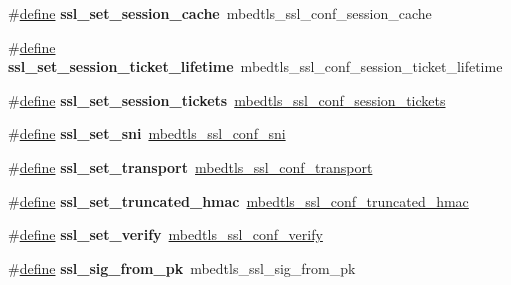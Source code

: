 \begin{DoxyCompactItemize}
\#\hyperlink{structdefine}{define} {\bfseries ssl\+\_\+set\+\_\+session\+\_\+cache}~mbedtls\+\_\+ssl\+\_\+conf\+\_\+session\+\_\+cache
\item 
\mbox{\label{compat-1_83_8h_ac6c83bdfdf7ac965e5949eac4bb98425}} 
\#\hyperlink{structdefine}{define} {\bfseries ssl\+\_\+set\+\_\+session\+\_\+ticket\+\_\+lifetime}~mbedtls\+\_\+ssl\+\_\+conf\+\_\+session\+\_\+ticket\+\_\+lifetime
\item 
\mbox{\label{compat-1_83_8h_aa46d11ad2b0ac3acb9cf8972f491d706}} 
\#\hyperlink{structdefine}{define} {\bfseries ssl\+\_\+set\+\_\+session\+\_\+tickets}~\hyperlink{ssl_8h_a97e547f900979337f4083a8158918fcc}{mbedtls\+\_\+ssl\+\_\+conf\+\_\+session\+\_\+tickets}
\item 
\mbox{\label{compat-1_83_8h_a1cb6e2fd9ac27592a397f41aace80189}} 
\#\hyperlink{structdefine}{define} {\bfseries ssl\+\_\+set\+\_\+sni}~\hyperlink{ssl_8h_a38ee2c1e3f232444df5ba3952d7ded33}{mbedtls\+\_\+ssl\+\_\+conf\+\_\+sni}
\item 
\mbox{\label{compat-1_83_8h_a71509d48537d6b5d2f28a90e59493ed5}} 
\#\hyperlink{structdefine}{define} {\bfseries ssl\+\_\+set\+\_\+transport}~\hyperlink{ssl_8h_a2eb03afe9b2ca0f144a1c307100dc0ca}{mbedtls\+\_\+ssl\+\_\+conf\+\_\+transport}
\item 
\mbox{\label{compat-1_83_8h_a9ad462fa79f9db405d84606efa9cc247}} 
\#\hyperlink{structdefine}{define} {\bfseries ssl\+\_\+set\+\_\+truncated\+\_\+hmac}~\hyperlink{ssl_8h_a739b67cfc0350ae4a2c9a2e99737bea7}{mbedtls\+\_\+ssl\+\_\+conf\+\_\+truncated\+\_\+hmac}
\item 
\mbox{\label{compat-1_83_8h_ad441632e8e7c3afb54d3404db863012f}} 
\#\hyperlink{structdefine}{define} {\bfseries ssl\+\_\+set\+\_\+verify}~\hyperlink{ssl_8h_afc2b6b55d7ccaf38d84a4fbf1655f426}{mbedtls\+\_\+ssl\+\_\+conf\+\_\+verify}
\item 
\mbox{\label{compat-1_83_8h_a167c4933ac1e8c4bddde2d0de2eb5959}} 
\#\hyperlink{structdefine}{define} {\bfseries ssl\+\_\+sig\+\_\+from\+\_\+pk}~mbedtls\+\_\+ssl\+\_\+sig\+\_\+from\+\_\+pk
\item 
\mbox{\label{compat-1_83_8h_ac86eb64b27adff2a5874688ed1be4801}} 

\end{DoxyCompactItemize}
